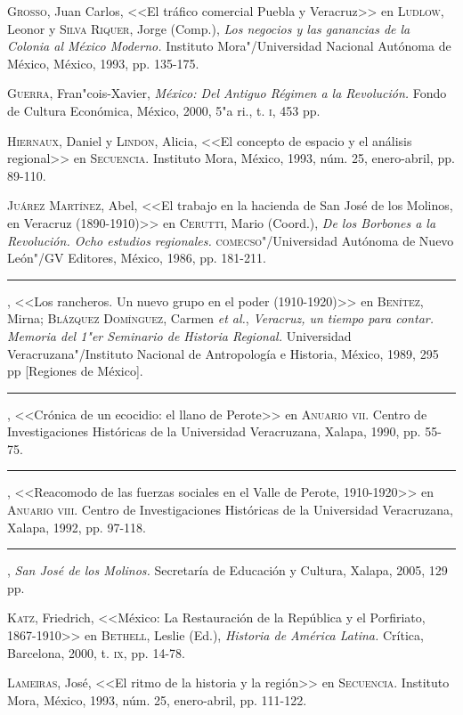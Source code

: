 \documentclass[14pt,twoside,final]{extbook} %
\begin{document}
\textsc{Grosso}, Juan Carlos, <<El tráfico comercial Puebla y Veracruz>> en \textsc{Ludlow}, Leonor y \textsc{Silva Riquer}, Jorge (Comp.), \emph{Los negocios y las ganancias de la Colonia al México Moderno.} Instituto Mora"/Universidad Nacional Autónoma de México, México, 1993, pp. 135-175.

\textsc{Guerra}, Fran"cois-Xavier, \emph{México: Del Antiguo Régimen a la Revolución.} Fondo de Cultura Económica, México, 2000, 5"a ri., t. \textsc{i}, 453 pp.

\textsc{Hiernaux}, Daniel y \textsc{Lindon}, Alicia, <<El concepto de espacio y el análisis regional>> en \textsc{Secuencia}. Instituto Mora, México, 1993, núm. 25, enero-abril, pp. 89-110.

\textsc{Juárez Martínez}, Abel, <<El trabajo en la hacienda de San José de los Molinos, en Veracruz (1890-1910)>> en \textsc{Cerutti}, Mario (Coord.), \emph{De los Borbones a la
Revolución. Ocho estudios regionales.} \textsc{comecso}"/Universidad Autónoma de Nuevo León"/GV Editores, México, 1986, pp. 181-211.

\rule{1cm}{0.4pt}, <<Los rancheros. Un nuevo grupo en el poder (1910-1920)>> en \textsc{Benítez}, Mirna; \textsc{Blázquez Domínguez}, Carmen \emph{et al.}, \emph{Veracruz, un tiempo para contar. Memoria del 1"er Seminario de Historia Regional.} Universidad Veracruzana"/Instituto Nacional de Antropología e Historia, México, 1989, 295 pp [Regiones de México].

\rule{1cm}{0.4pt}, <<Crónica de un ecocidio: el llano de Perote>> en \textsc{Anuario vii}. Centro de Investigaciones Históricas de la Universidad Veracruzana, Xalapa, 1990, pp. 55-75.

\rule{1cm}{0.4pt}, <<Reacomodo de las fuerzas sociales en el Valle de Perote, 1910-1920>> en \textsc{Anuario viii}. Centro de Investigaciones Históricas de la Universidad Veracruzana, Xalapa, 1992, pp. 97-118.

\rule{1cm}{0.4pt}, \emph{San José de los Molinos.} Secretaría de Educación y Cultura, Xalapa, 2005, 129 pp.

\textsc{Katz}, Friedrich, <<México: La Restauración de la República y el Porfiriato, 1867-1910>> en \textsc{Bethell}, Leslie (Ed.), \emph{Historia de América Latina.} Crítica, Barcelona, 2000, t. \textsc{ix}, pp. 14-78.

\textsc{Lameiras}, José, <<El ritmo de la historia y la región>> en \textsc{Secuencia}. Instituto Mora, México, 1993, núm. 25, enero-abril, pp. 111-122.
\end{document}
